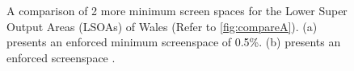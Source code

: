 \begin{figure}

\caption{A comparison of 2 more minimum screen spaces for the Lower Super Output Areas (LSOAs) of Wales (Refer to \ref{fig:compareA}). (a) presents an enforced minimum screenspace of 0.5\%. (b) presents an enforced screenspace .}
\end{figure}
